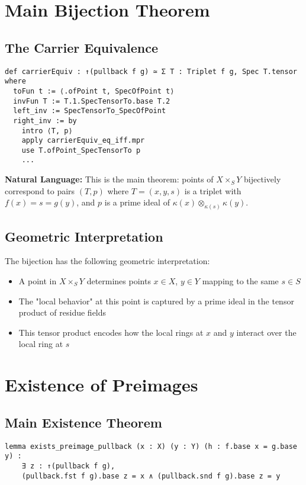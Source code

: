 \documentclass{article}
\theoremstyle{definition}
\begin{document}
\section{Main Bijection Theorem}

\subsection{The Carrier Equivalence}

\begin{lstlisting}
def carrierEquiv : ↑(pullback f g) ≃ Σ T : Triplet f g, Spec T.tensor where
  toFun t := ⟨.ofPoint t, SpecOfPoint t⟩
  invFun T := T.1.SpecTensorTo.base T.2
  left_inv := SpecTensorTo_SpecOfPoint
  right_inv := by
    intro ⟨T, p⟩
    apply carrierEquiv_eq_iff.mpr
    use T.ofPoint_SpecTensorTo p
    ...
\end{lstlisting}

\textbf{Natural Language:} This is the main theorem: points of $X \times_S Y$ bijectively correspond to pairs $(T, p)$ where $T = (x, y, s)$ is a triplet with $f(x) = s = g(y)$, and $p$ is a prime ideal of $\kappa(x) \otimes_{\kappa(s)} \kappa(y)$.

\subsection{Geometric Interpretation}

The bijection has the following geometric interpretation:
\begin{itemize}
\item A point in $X \times_S Y$ determines points $x \in X$, $y \in Y$ mapping to the same $s \in S$
\item The "local behavior" at this point is captured by a prime ideal in the tensor product of residue fields
\item This tensor product encodes how the local rings at $x$ and $y$ interact over the local ring at $s$
\end{itemize}

\section{Existence of Preimages}

\subsection{Main Existence Theorem}

\begin{lstlisting}
lemma exists_preimage_pullback (x : X) (y : Y) (h : f.base x = g.base y) :
    ∃ z : ↑(pullback f g),
    (pullback.fst f g).base z = x ∧ (pullback.snd f g).base z = y
\end{lstlisting}
\end{document}
